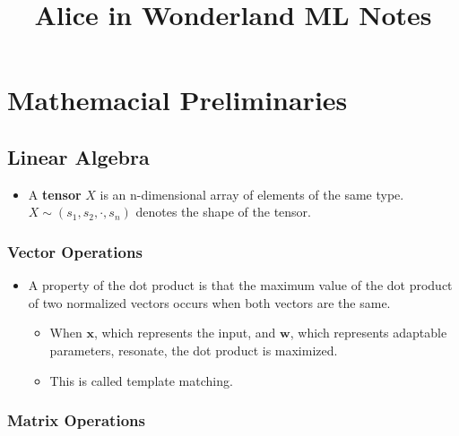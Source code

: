 \documentclass{article}
\title{\vspace{-3cm}Alice in Wonderland ML Notes}
\author{}
\date{}
\newcommand{\tbf}[1]{\textbf{#1}}
\newcommand{\mbf}[1]{\mathbf{#1}}
\begin{document}
\maketitle

\setcounter{section}{1}
\section{Mathemacial Preliminaries}

\subsection{Linear Algebra}

\begin{itemize}
    \item A \tbf{tensor} $X$ is an n-dimensional array of elements of the same type. $X \sim (s_1,s_2,\cdot,s_n)$ denotes the shape of the tensor.
\end{itemize}

\subsubsection{Vector Operations}

\begin{itemize}
    \item A property of the dot product is that the maximum value of the dot product of two normalized vectors occurs when both vectors are the same. 
    \begin{itemize}
        \item When $\mbf{x}$, which represents the input, and $\mbf{w}$, which represents adaptable parameters, resonate, the dot product is maximized.
        \item This is called template matching. 
    \end{itemize} 
\end{itemize}

\subsubsection{Matrix Operations}
\end{document}
